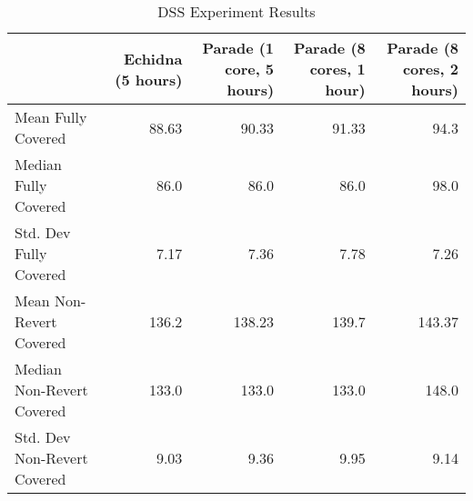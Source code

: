 \documentclass[sigconf]{acmart}
\begin{document}
{\begin{table*}
\centering
\begin{tabular}{l|r|r|r|r}
& Echidna (5 hours) & Parade (1 core, 5 hours) & Parade (8 cores, 1
                                                 hour) & Parade (8
                                                         cores, 2
                                                         hours) \\
  \hline
  Mean Fully Covered & 88.63 & 90.33 & 91.33 & 94.3 \\
  Median Fully Covered & 86.0 & 86.0 & 86.0 & 98.0 \\
  Std. Dev Fully Covered & 7.17 & 7.36 & 7.78 & 7.26 \\
  \hline
  Mean Non-Revert Covered & 136.2 & 138.23 & 139.7 & 143.37 \\
  Median Non-Revert Covered & 133.0 & 133.0 & 133.0 & 148.0 \\
  Std. Dev Non-Revert Covered & 9.03 & 9.36 & 9.95 & 9.14 \\                         
\end{tabular}
\caption{DSS Experiment Results}
\label{tab:exp}
\end{table*}

}
\end{document}
